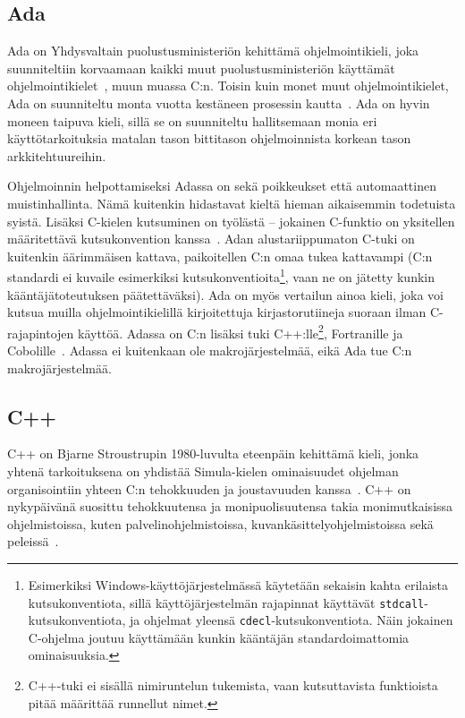 \subsection{Ada}

Ada on Yhdysvaltain puolustusministeriön kehittämä ohjelmointikieli, joka
suunniteltiin korvaamaan kaikki muut puolustusministeriön käyttämät
ohjelmointikielet~\citep{adahistory}, muun muassa C:n. Toisin kuin monet muut
ohjelmointikielet, Ada on suunniteltu monta vuotta kestäneen prosessin
kautta~\citep[s.~121]{theoryandpractice}. Ada on hyvin moneen taipuva kieli,
sillä se on suunniteltu hallitsemaan monia eri käyttötarkoituksia matalan tason
bittitason ohjelmoinnista korkean tason arkkitehtuureihin.

Ohjelmoinnin helpottamiseksi Adassa on sekä poikkeukset että automaattinen
muistinhallinta. Nämä kuitenkin hidastavat kieltä hieman aikaisemmin todetuista
syistä. Lisäksi C-kielen kutsuminen on työlästä  -- jokainen C-funktio on
yksitellen määritettävä kutsukonvention
kanssa~\citep[s.~471]{ADA12}. Adan alustariippumaton C-tuki on kuitenkin
äärimmäisen kattava, paikoitellen C:n omaa tukea kattavampi (C:n standardi ei
kuvaile esimerkiksi kutsukonventioita\footnote{Esimerkiksi
Windows-käyttöjärjestelmässä käytetään sekaisin kahta erilaista
kutsukonventiota, sillä käyttöjärjestelmän rajapinnat käyttävät
\texttt{stdcall}-kutsukonventiota, ja ohjelmat yleensä
\texttt{cdecl}-kutsukonventiota. Näin jokainen C-ohjelma joutuu käyttämään
kunkin kääntäjän standardoimattomia ominaisuuksia.}, vaan ne on jätetty kunkin
kääntäjätoteutuksen päätettäväksi). Ada on myös vertailun ainoa kieli, joka voi
kutsua muilla ohjelmointikielillä kirjoitettuja kirjastorutiineja suoraan ilman
C-rajapintojen käyttöä. Adassa on C:n lisäksi tuki C++:lle\footnote{C++-tuki ei
sisällä nimiruntelun tukemista, vaan kutsuttavista funktioista pitää määrittää
runnellut nimet.}, Fortranille ja Cobolille~\citep[s.~585]{ADA12}. Adassa ei
kuitenkaan ole makrojärjestelmää, eikä Ada tue C:n makrojärjestelmää.

\subsection{C++}

C++ on Bjarne Stroustrupin 1980-luvulta eteenpäin kehittämä kieli, jonka
yhtenä tarkoituksena on yhdistää Simula-kielen ominaisuudet ohjelman
organisointiin yhteen C:n tehokkuuden ja joustavuuden
kanssa~\citep{cpphistory}. C++ on nykypäivänä suosittu tehokkuutensa ja
monipuolisuutensa takia monimutkaisissa ohjelmistoissa, kuten
palvelinohjelmistoissa, kuvankäsittelyohjelmistoissa sekä
peleissä~\citep{cppapps}.

